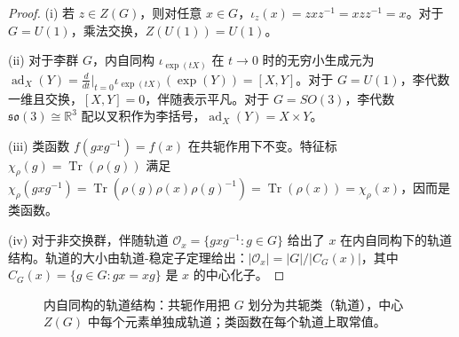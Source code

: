 \begin{proof}
(i) 若 $z \in Z(G)$，则对任意 $x \in G$，$\iota_z(x) = zxz^{-1} = xzz^{-1} = x$。对于 $G = U(1)$，乘法交换，$Z(U(1)) = U(1)$。

(ii) 对于李群 $G$，内自同构 $\iota_{\exp(tX)}$ 在 $t \to 0$ 时的无穷小生成元为 $\operatorname{ad}_X(Y) = \frac{d}{dt}\big|_{t=0} \iota_{\exp(tX)}(\exp(Y)) = [X,Y]$。对于 $G = U(1)$，李代数一维且交换，$[X,Y]=0$，伴随表示平凡。对于 $G = SO(3)$，李代数 $\mathfrak{so}(3) \cong \mathbb{R}^3$ 配以叉积作为李括号，$\operatorname{ad}_X(Y) = X \times Y$。

(iii) 类函数 $f(gxg^{-1}) = f(x)$ 在共轭作用下不变。特征标 $\chi_\rho(g) = \operatorname{Tr}(\rho(g))$ 满足 $\chi_\rho(gxg^{-1}) = \operatorname{Tr}(\rho(g)\rho(x)\rho(g)^{-1}) = \operatorname{Tr}(\rho(x)) = \chi_\rho(x)$，因而是类函数。

(iv) 对于非交换群，伴随轨道 $\mathcal{O}_x = \{gxg^{-1} : g \in G\}$ 给出了 $x$ 在内自同构下的轨道结构。轨道的大小由轨道-稳定子定理给出：$|\mathcal{O}_x| = |G|/|C_G(x)|$，其中 $C_G(x) = \{g \in G : gx = xg\}$ 是 $x$ 的中心化子。
\end{proof}

\begin{figure}[htbp]
\centering
{}
\caption{内自同构的轨道结构：共轭作用把 $G$ 划分为共轭类（轨道），中心 $Z(G)$ 中每个元素单独成轨道；类函数在每个轨道上取常值。}
\label{fig:inner_automorphism_orbits}
\end{figure}


